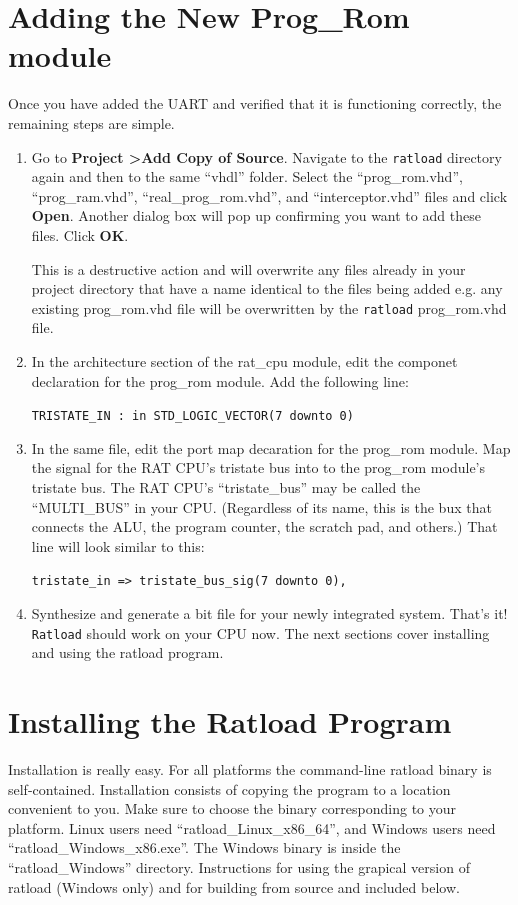 \documentclass[notitlepage]{article}
\newcommand{\warningsign}{\fontencoding{U}\fontfamily{futs}\Large\selectfont\char 66\relax}
\begin{document}
\section{Adding the New Prog\_Rom module}
Once you have added the UART and verified that it is functioning correctly, the remaining steps are simple.
\begin{enumerate}
\item Go to \textbf{Project \textgreater Add Copy of Source}. Navigate to the \texttt{ratload} directory again and then to the same ``vhdl'' folder. Select the ``prog\_rom.vhd'', ``prog\_ram.vhd'', ``real\_prog\_rom.vhd'', and ``interceptor.vhd'' files and click \textbf{Open}. Another dialog box will pop up confirming you want to add these files. Click \textbf{OK}.

\begin{infobox}
  {\warningsign} This is a destructive action and will overwrite any files already in your project directory that have a name identical to the files being added e.g. any existing prog\_rom.vhd file will be overwritten by the \texttt{ratload} prog\_rom.vhd file.
\end{infobox}

\item In the architecture section of the rat\_cpu module, edit the componet declaration for the prog\_rom module. Add the following line:\\
  \centerline{\texttt{TRISTATE\_IN : in STD\_LOGIC\_VECTOR(7 downto 0)}}

\item In the same file, edit the port map decaration for the prog\_rom module. Map the signal for the RAT CPU's tristate bus into to the prog\_rom module's tristate bus. The RAT CPU's ``tristate\_bus'' may be called the ``MULTI\_BUS'' in your CPU. (Regardless of its name, this is the bux that connects the ALU, the program counter, the scratch pad, and others.) That line will look similar to this:\\
  \centerline{\texttt{tristate\_in =\textgreater ~tristate\_bus\_sig(7 downto 0),}}

\item Synthesize and generate a bit file for your newly integrated system. That's it! \texttt{Ratload} should work on your CPU now. The next sections cover installing and using the ratload program.
\end{enumerate}

\section{Installing the Ratload Program}
Installation is really easy. For all platforms the command-line ratload binary is self-contained. Installation consists of copying the program to a location convenient to you. Make sure to choose the binary corresponding to your platform. Linux users need ``ratload\_Linux\_x86\_64'', and Windows users need ``ratload\_Windows\_x86.exe''. The Windows binary is inside the ``ratload\_Windows'' directory. Instructions for using the grapical version of ratload (Windows only) and for building from source and included below.
\end{document}
